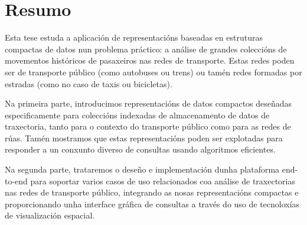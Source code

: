 \chapter*{Resumo}

Esta tese estuda a aplicaci\'on de representaci\'ons baseadas en estruturas compactas de datos nun problema pr\'actico: a an\'alise de grandes colecci\'ons de movementos hist\'oricos de pasaxeiros nas redes de transporte. Estas redes poden ser de transporte p\'ublico (como autobuses ou trens) ou tam\'en redes formadas por estradas (como no caso de taxis ou bicicletas).

Na primeira parte, introducimos representaci\'ons de datos compactos dese\~nadas especificamente para colecci\'ons indexadas de almacenamento de datos de traxectoria, tanto para o contexto do transporte p\'ublico como para as redes de r\'uas. Tam\'en mostramos que estas representaci\'ons poden ser explotadas para responder a un conxunto diverso de consultas usando algoritmos eficientes.

Na segunda parte, trataremos o dese\~no e implementaci\'on dunha plataforma end-to-end para soportar varios casos de uso relacionados coa an\'alise de traxectorias nas redes de transporte p\'ublico, integrando as nosas representaci\'ons compactas e proporcionando unha interface gr\'afica de consultas a trav\'es do uso de tecnolox\'ias de visualizaci\'on espacial.

 

